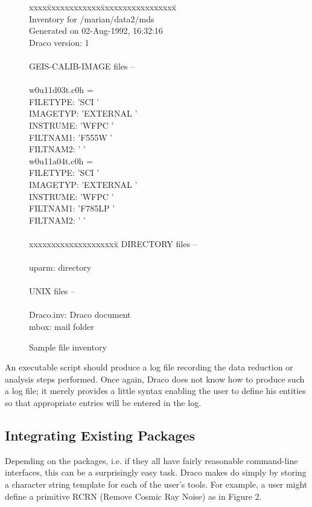 \begin{figure}[hbt]
\caption{Sample file inventory}
\begin{tabbing}
xxxx\=xxxxxxxxxxxx\=xxxxxxxxxxxxxxxxx\=\kill
\\
Inventory for /marian/data2/mds\\
Generated on 02-Aug-1992, 16:32:16\\
Draco version: 1\\
\\
GEIS-CALIB-IMAGE files --\\
\\
w0u11d03t.c0h =\\
    \>FILETYPE:   \>'SCI             \>'\\
    \>IMAGETYP:   \>'EXTERNAL        \>'\\
    \>INSTRUME:   \>'WFPC            \>'\\
    \>FILTNAM1:   \>'F555W           \>'\\
    \>FILTNAM2:   \>'                \>'\\
w0u11a04t.c0h =\\
    \>FILETYPE:   \>'SCI             \>'\\
    \>IMAGETYP:   \>'EXTERNAL        \>'\\
    \>INSTRUME:   \>'WFPC            \>'\\
    \>FILTNAM1:   \>'F785LP          \>'\\
    \>FILTNAM2:   \>'                \>'\\
\\
xxxxxxxxxxxxxxxxxxxx\=\kill
DIRECTORY files --\\
\\
uparm:		\>directory\\
\\
UNIX files --\\
\\
Draco.inv:	\>Draco document\\
mbox:		\>mail folder\\
\end{tabbing}
\end{figure}

An executable script should produce a log file recording the data reduction
or analysis steps performed.  Once again, Draco does not know how to produce
such a log file; it merely provides a little syntax enabling the user to
define his entities so that appropriate entries will be entered in the log.

\subsection{Integrating Existing Packages}
Depending on the packages, i.e. if they all have fairly reasonable
command-line interfaces, this can be a surprisingly easy task.  Draco makes
do simply by storing a character string template for each of the user's tools.
For example, a user might define a primitive RCRN (Remove Cosmic Ray Noise) as
in Figure 2.

